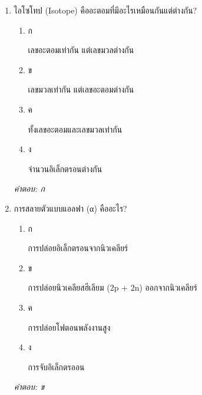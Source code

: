 \documentclass[12pt]{article}
\begin{document}
\begin{enumerate}[label=\arabic*., itemsep=0.5\baselineskip, topsep=0.5\baselineskip, leftmargin=*]
\item ไอโซโทป (Isotope) คืออะตอมที่มีอะไรเหมือนกันแต่ต่างกัน?
\begin{enumerate}[label=\alph*)., itemsep=0.3\baselineskip, topsep=0.3\baselineskip]
\item ก\ 
\begin{minipage}[t]{0.9\linewidth}
\raggedright เลขอะตอมเท่ากัน แต่เลขมวลต่างกัน
\end{minipage}
\item ข\ 
\begin{minipage}[t]{0.9\linewidth}
\raggedright เลขมวลเท่ากัน แต่เลขอะตอมต่างกัน
\end{minipage}
\item ค\ 
\begin{minipage}[t]{0.9\linewidth}
\raggedright ทั้งเลขอะตอมและเลขมวลเท่ากัน
\end{minipage}
\item ง\ 
\begin{minipage}[t]{0.9\linewidth}
\raggedright จำนวนอิเล็กตรอนต่างกัน
\end{minipage}
\end{enumerate}
\vspace{-0.3\baselineskip}
\begin{small}
\textit{คำตอบ: ก}
\end{small}

\item การสลายตัวแบบแอลฟา (α) คืออะไร?
\begin{enumerate}[label=\alph*)., itemsep=0.3\baselineskip, topsep=0.3\baselineskip]
\item ก\ 
\begin{minipage}[t]{0.9\linewidth}
\raggedright การปล่อยอิเล็กตรอนจากนิวเคลียร์
\end{minipage}
\item ข\ 
\begin{minipage}[t]{0.9\linewidth}
\raggedright การปล่อยนิวเคลียสฮีเลียม (2p + 2n) ออกจากนิวเคลียร์
\end{minipage}
\item ค\ 
\begin{minipage}[t]{0.9\linewidth}
\raggedright การปล่อยโฟตอนพลังงานสูง
\end{minipage}
\item ง\ 
\begin{minipage}[t]{0.9\linewidth}
\raggedright การจับอิเล็กตรออน
\end{minipage}
\end{enumerate}
\vspace{-0.3\baselineskip}
\begin{small}
\textit{คำตอบ: ข}
\end{small}


\end{enumerate}
\end{document}
